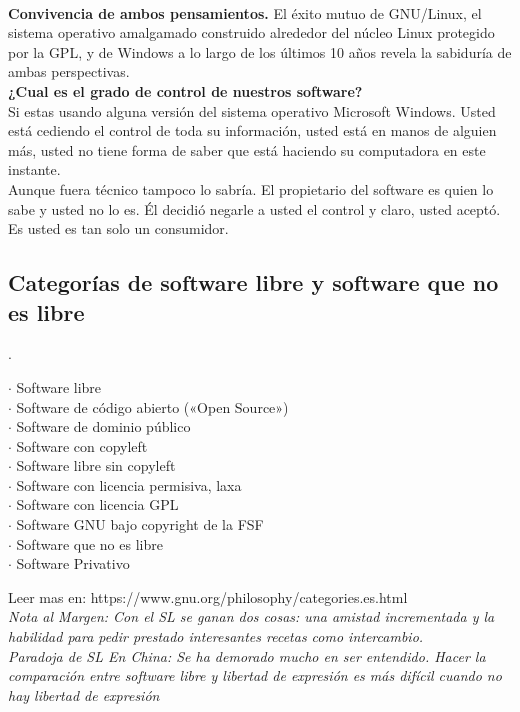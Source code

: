 \documentclass{book}
\begin{document}
\\
{\bf Convivencia de ambos pensamientos.}
El éxito mutuo de GNU/Linux, el sistema operativo amalgamado construido alrededor del núcleo
Linux protegido por la GPL, y de Windows a lo largo de los últimos 10 años revela la sabiduría de
ambas perspectivas.
\\
{\bf ¿Cual es el grado de control de nuestros software?}
\\
Si estas usando alguna versión del sistema operativo Microsoft Windows. Usted está cediendo el control de toda su información, usted está en manos de alguien más, usted no tiene forma de saber que está haciendo su computadora en este instante.
\\
Aunque fuera  técnico tampoco lo sabría. El propietario del software es quien lo sabe y usted no lo es. 
Él decidió negarle a usted el control y claro, usted aceptó. Es usted es tan solo un consumidor.

\subsection{Categorías de software libre y software que no es libre}
	.
\begin{description}
	\item[$\cdot$ Software libre]
	\item[$\cdot$ Software de código abierto («Open Source»)]
	\item[$\cdot$ Software de dominio público]
	\item[$\cdot$ Software con copyleft]
	\item[$\cdot$ Software libre sin copyleft]
	\item[$\cdot$ Software con licencia permisiva, laxa]
	\item[$\cdot$ Software con licencia GPL]
	\item[$\cdot$ Software GNU bajo copyright de la FSF]
	\item[$\cdot$ Software que no es libre]
	\item[$\cdot$ Software Privativo]
\end{description}

Leer mas en: https://www.gnu.org/philosophy/categories.es.html
\\
{\it
\emph{Nota al Margen:} Con el SL se ganan dos cosas: una amistad incrementada y la habilidad para pedir prestado interesantes recetas como intercambio.
\\
\emph{Paradoja de SL En China:}
Se ha demorado mucho en ser entendido. Hacer la comparación entre software libre y libertad de expresión es más difícil cuando no hay libertad de expresión
}
\end{document}
